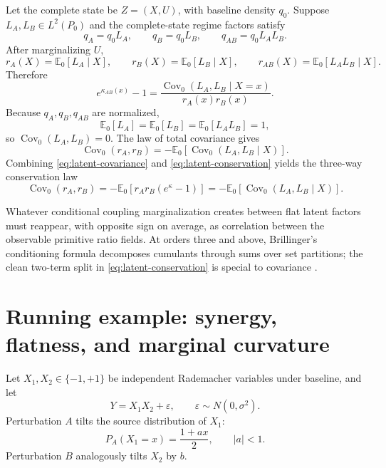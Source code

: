 \documentclass[11pt]{article}
\newcommand{\E}{\mathbb{E}}
\newcommand{\Cov}{\operatorname{Cov}}
\begin{document}
Let the complete state be \(Z=(X,U)\), with baseline density \(q_0\).  Suppose \(L_A,L_B\in L^2(P_0)\) and the complete-state regime factors satisfy
\begin{equation}
q_A=q_0L_A,
\qquad
q_B=q_0L_B,
\qquad
q_{AB}=q_0L_AL_B.
\label{eq:latent-flat}
\end{equation}
After marginalizing \(U\),
\begin{equation}
r_A(X)=\E_0[L_A\mid X],
\qquad
r_B(X)=\E_0[L_B\mid X],
\qquad
r_{AB}(X)=\E_0[L_AL_B\mid X].
\label{eq:latent-projections}
\end{equation}
Therefore
\begin{equation}
\boxed{
e^{\kappa_{AB}(x)}-1
=
\frac{\Cov_0(L_A,L_B\mid X=x)}{r_A(x)r_B(x)}.
}
\label{eq:latent-covariance}
\end{equation}
Because \(q_A,q_B,q_{AB}\) are normalized,
\begin{equation}
\E_0[L_A]=\E_0[L_B]=\E_0[L_AL_B]=1,
\end{equation}
so \(\Cov_0(L_A,L_B)=0\).  The law of total covariance gives
\begin{equation}
\boxed{
\Cov_0(r_A,r_B)
=
-\E_0[\Cov_0(L_A,L_B\mid X)].
}
\label{eq:latent-conservation}
\end{equation}
Combining \eqref{eq:latent-covariance} and \eqref{eq:latent-conservation} yields the three-way conservation law
\begin{equation}
\boxed{
\Cov_0(r_A,r_B)
=
-\E_0[r_A r_B(e^{\kappa}-1)]
=
-\E_0[\Cov_0(L_A,L_B\mid X)].
}
\label{eq:three-way-conservation}
\end{equation}

Whatever conditional coupling marginalization creates between flat latent factors must reappear, with opposite sign on average, as correlation between the observable primitive ratio fields.  At orders three and above, Brillinger's conditioning formula decomposes cumulants through sums over set partitions; the clean two-term split in \eqref{eq:latent-conservation} is special to covariance \citep{brillinger1969cumulants}.

\section{Running example: synergy, flatness, and marginal curvature}

Let \(X_1,X_2\in\{-1,+1\}\) be independent Rademacher variables under baseline, and let
\begin{equation}
Y=X_1X_2+\varepsilon,
\qquad
\varepsilon\sim N(0,\sigma^2).
\label{eq:running-system}
\end{equation}
Perturbation \(A\) tilts the source distribution of \(X_1\):
\begin{equation}
P_A(X_1=x)=\frac{1+ax}{2},
\qquad |a|<1.
\end{equation}
Perturbation \(B\) analogously tilts \(X_2\) by \(b\).
\end{document}
